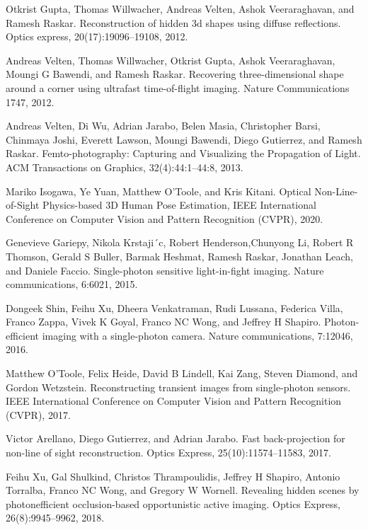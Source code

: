 \documentclass[10pt,journal,compsoc]{IEEEtran}
\newif\ifpeerreview
\begin{document}
\begin{thebibliography}{70} 

 Otkrist Gupta, Thomas Willwacher, Andreas Velten, Ashok Veeraraghavan, and Ramesh Raskar. Reconstruction of hidden 3d shapes using diffuse reflections. Optics express, 20(17):19096–19108, 2012.

 Andreas Velten, Thomas Willwacher, Otkrist Gupta, Ashok Veeraraghavan, Moungi G Bawendi, and Ramesh Raskar. Recovering three-dimensional shape around a corner using ultrafast time-of-flight imaging. Nature Communications 1747, 2012.

 Andreas Velten, Di Wu, Adrian Jarabo, Belen Masia, Christopher Barsi, Chinmaya Joshi, Everett Lawson, Moungi Bawendi, Diego Gutierrez, and Ramesh Raskar. Femto-photography: Capturing and Visualizing the Propagation of Light. ACM Transactions on Graphics, 32(4):44:1–44:8, 2013.

 Mariko Isogawa, Ye Yuan, Matthew O’Toole, and Kris Kitani. Optical Non-Line-of-Sight Physics-based 3D Human Pose Estimation, IEEE International Conference on Computer Vision and Pattern Recognition (CVPR), 2020.

 Genevieve Gariepy, Nikola Krstaji´c, Robert Henderson,Chunyong Li, Robert R Thomson, Gerald S Buller, Barmak Heshmat, Ramesh Raskar, Jonathan Leach, and Daniele Faccio. Single-photon sensitive light-in-fight imaging. Nature communications, 6:6021, 2015.

 Dongeek Shin, Feihu Xu, Dheera Venkatraman, Rudi Lussana, Federica Villa, Franco Zappa, Vivek K Goyal, Franco NC Wong, and Jeffrey H Shapiro. Photon-efficient imaging with a single-photon camera. Nature communications, 7:12046, 2016.

 Matthew O’Toole, Felix Heide, David B Lindell, Kai Zang, Steven Diamond, and Gordon Wetzstein. Reconstructing transient images from single-photon sensors. IEEE International Conference on Computer Vision and Pattern Recognition (CVPR), 2017.

 Victor Arellano, Diego Gutierrez, and Adrian Jarabo. Fast back-projection for non-line of sight reconstruction. Optics Express, 25(10):11574–11583, 2017.

 Feihu Xu, Gal Shulkind, Christos Thrampoulidis, Jeffrey H Shapiro, Antonio Torralba, Franco NC Wong, and Gregory W Wornell. Revealing hidden scenes by photonefficient occlusion-based opportunistic active imaging. Optics Express, 26(8):9945–9962, 2018.


\end{thebibliography}
\end{document}
